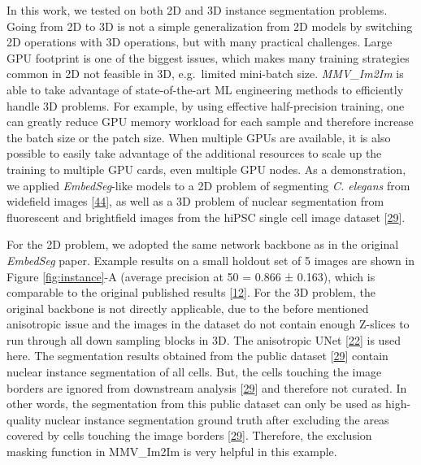 In this work, we tested on both 2D and 3D instance segmentation problems. Going from 2D to 3D is not a simple generalization from 2D models by switching 2D operations with 3D operations, but with many practical challenges. Large GPU footprint is one of the biggest issues, which makes many training strategies common in 2D not feasible in 3D, e.g.~limited mini-batch size. \emph{MMV\_Im2Im} is able to take advantage of state-of-the-art ML engineering methods to efficiently handle 3D problems. For example, by using effective half-precision training, one can greatly reduce GPU memory workload for each sample and therefore increase the batch size or the patch size. When multiple GPUs are available, it is also possible to easily take advantage of the additional resources to scale up the training to multiple GPU cards, even multiple GPU nodes. As a demonstration, we applied \emph{EmbedSeg}-like models to a 2D problem of segmenting \emph{C. elegans} from widefield images {[}\protect\hyperlink{ref-138foKNOh}{44}{]}, as well as a 3D problem of nuclear segmentation from fluorescent and brightfield images from the hiPSC single cell image dataset {[}\protect\hyperlink{ref-5sGcmDuy}{29}{]}.

For the 2D problem, we adopted the same network backbone as in the original \emph{EmbedSeg} paper. Example results on a small holdout set of 5 images are shown in Figure \ref{fig:instance}-A (average precision at 50 = 0.866 ± 0.163), which is comparable to the original published results {[}\protect\hyperlink{ref-QmYuUQ5K}{12}{]}. For the 3D problem, the original backbone is not directly applicable, due to the before mentioned anisotropic issue and the images in the dataset do not contain enough Z-slices to run through all down sampling blocks in 3D. The anisotropic UNet {[}\protect\hyperlink{ref-jM3v1UjQ}{22}{]} is used here. The segmentation results obtained from the public dataset {[}\protect\hyperlink{ref-5sGcmDuy}{29}{]} contain nuclear instance segmentation of all cells. But, the cells touching the image borders are ignored from downstream analysis {[}\protect\hyperlink{ref-5sGcmDuy}{29}{]} and therefore not curated. In other words, the segmentation from this public dataset can only be used as high-quality nuclear instance segmentation ground truth after excluding the areas covered by cells touching the image borders {[}\protect\hyperlink{ref-5sGcmDuy}{29}{]}. Therefore, the exclusion masking function in MMV\_Im2Im is very helpful in this example.

